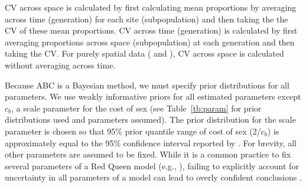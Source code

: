\documentclass{article}\usepackage[]{graphicx}\usepackage[]{color}
\begin{document}
CV across space is calculated by first calculating mean proportions by averaging across time (generation) for each site (subpopulation) and then taking the the CV of these mean proportions.
CV across time (generation) is calculated by first averaging proportions across space (subpopulation) at each generation and then taking the CV.
For purely spatial data (\cite{dagan2013clonal} and \cite{mckone2016fine}), CV across space is calculated without averaging across time.

Because ABC is a Bayesian method, we must specify prior distributions for all parameters.
We use weakly informative priors for all estimated parameters except $c_b$, a scale parameter for the cost of sex (see Table~\ref{tb:param} for prior distributions used and parameters assumed).
The prior distribution for the scale parameter is chosen so that 95\% prior quantile range of cost of sex (2/$c_b$) is approximately equal to the 95\% confidence interval reported by \cite{gibson2017two}.
For brevity, all other parameters are assumed to be fixed.
While it is a common practice to fix several parameters of a Red Queen model (e.g., \cite{lively2010epidemiological, ashby2015diversity, haafke2016eco, ashby2019understanding}), failing to explicitly account for uncertainty in all parameters of a model can lead to overly confident conclusions \citep{elderd2006uncertainty}.
\end{document}
